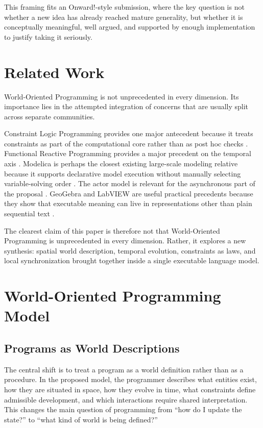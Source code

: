 This framing fits an Onward!-style submission, where the key question is not whether a new idea has already reached mature generality, but whether it is conceptually meaningful, well argued, and supported by enough implementation to justify taking it seriously.

\section{Related Work}

World-Oriented Programming is not unprecedented in every dimension.
Its importance lies in the attempted integration of concerns that are usually split across separate communities.

Constraint Logic Programming provides one major antecedent because it treats constraints as part of the computational core rather than as post hoc checks \cite{jaffar1987clp}.
Functional Reactive Programming provides a major precedent on the temporal axis \cite{hudak1999frp,elliott1997fra}.
Modelica is perhaps the closest existing large-scale modeling relative because it supports declarative model execution without manually selecting variable-solving order \cite{modelica2023spec}.
The actor model is relevant for the asynchronous part of the proposal \cite{hewitt1973actor}.
GeoGebra and LabVIEW are useful practical precedents because they show that executable meaning can live in representations other than plain sequential text \cite{geogebra,ni2026labview}.

The clearest claim of this paper is therefore not that World-Oriented Programming is unprecedented in every dimension.
Rather, it explores a new synthesis: spatial world description, temporal evolution, constraints as laws, and local synchronization brought together inside a single executable language model.

\section{World-Oriented Programming Model}

\subsection{Programs as World Descriptions}

The central shift is to treat a program as a world definition rather than as a procedure.
In the proposed model, the programmer describes what entities exist, how they are situated in space, how they evolve in time, what constraints define admissible development, and which interactions require shared interpretation.
This changes the main question of programming from ``how do I update the state?'' to ``what kind of world is being defined?''

